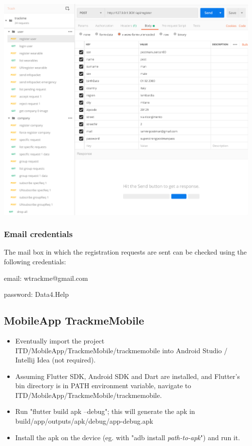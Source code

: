 \documentclass[../main.tex]{subfiles}
\begin{document}
\includegraphics[width = \linewidth ]{images/postman_screen.png}

\subsubsection{Email credentials}
The mail box in which the registration requests are sent can be checked using the following credentials:
\begin{description}
	\item email: wtrackme@gmail.com
	\item password: Data4.Help 
\end{description}


\subsection{MobileApp TrackmeMobile}

\begin{itemize}
	\item Eventually import the project ITD/MobileApp/TrackmeMobile/trackmemobile into Android Studio / Intellij Idea (not required).
	\item Assuming Flutter SDK, Android SDK and Dart are installed, and Flutter's bin directory is in PATH environment variable, navigate to ITD/MobileApp/TrackmeMobile/trackmemobile.
	\item Run "flutter build apk --debug"; this will generate the apk in build/app/outputs/apk/debug/app-debug.apk
	\item Install the apk on the device (eg. with "adb install \textit{path-to-apk}") and run it.
\end{itemize}
\end{document}
